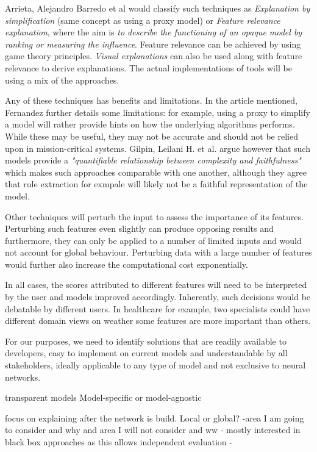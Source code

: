 \documentclass[proposal]{softeng}
\begin{document}
Arrieta, Alejandro Barredo et al \cite{BarredoArrietaAlejandro2020EAIX} would classify such techniques as \textit{Explanation by simplification} (same concept as using a proxy model) or \textit{Feature relevance explanation}, where the aim is \textit{to describe the functioning of an opaque model by ranking or measuring the influence}. Feature relevance can be achieved by using game theory principles. \textit{Visual explanations} can also be used along with feature relevance to derive explanations. The actual implementations of tools will be using a mix of the approaches.

Any of these techniques has benefits and limitations. In the article mentioned, Fernandez further details some limitations: for example, using a proxy to simplify a model will rather provide hints on how the underlying algorithms performs. While these may be useful, they may not be accurate and should not be relied upon in mission-critical systems. Gilpin, Leilani H. et al.\cite{GilpinLeilaniH} argue however that such models provide a \textit{"quantifiable relationship between
complexity and faithfulness"} which makes such approaches comparable with one another, although they agree that rule extraction for exmpale will likely not be a faithful representation of the model.

Other techniques will perturb the input to assess the importance of its features. Perturbing such features even slightly can produce opposing results and furthermore, they can only be applied to a number of limited inputs and would not account for global behaviour. Perturbing data with a large number of features would further also increase the computational cost exponentially.

In all cases, the scores attributed to different features will need to be interpreted by the user and models improved accordingly. Inherently, such decisions would be debatable by different users. In healthcare for example, two specialists could have different domain views on weather some features are more important than others.


For our purposes, we need to identify solutions that are readily available to developers, easy to implement on current models and understandable by all stakeholders, ideally applicable to any type of model and not exclusive to neural networks.

transparent models
Model-specific or model-agnostic

focus on explaining after the network is build.
Local or global?
-area I am going to consider and why and area I will not consider and ww
- mostly interested in black box approaches as this allows independent evaluation
-
\end{document}

